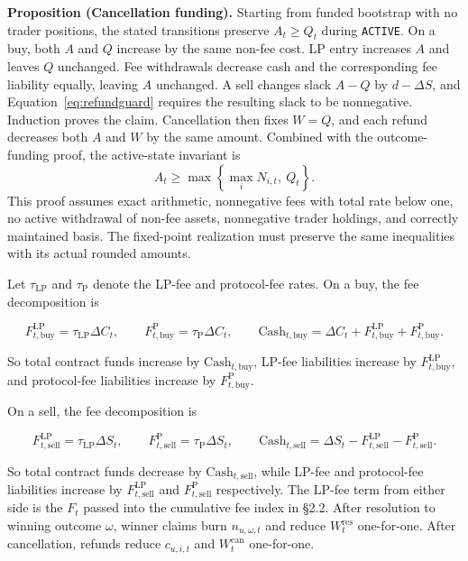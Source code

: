 \documentclass[10pt]{article}
\begin{document}
\textbf{Proposition (Cancellation funding).}
Starting from funded bootstrap with no trader positions, the stated transitions preserve $A_t\ge Q_t$ during \texttt{ACTIVE}. On a buy, both $A$ and $Q$ increase by the same non-fee cost. LP entry increases $A$ and leaves $Q$ unchanged. Fee withdrawals decrease cash and the corresponding fee liability equally, leaving $A$ unchanged. A sell changes slack $A-Q$ by $d-\Delta S$, and Equation~\ref{eq:refundguard} requires the resulting slack to be nonnegative. Induction proves the claim. Cancellation then fixes $W=Q$, and each refund decreases both $A$ and $W$ by the same amount. Combined with the outcome-funding proof, the active-state invariant is
\[
A_t\ge\max\!\left\{\max_i N_{i,t},\ Q_t\right\}.
\]
This proof assumes exact arithmetic, nonnegative fees with total rate below one, no active withdrawal of non-fee assets, nonnegative trader holdings, and correctly maintained basis. The fixed-point realization must preserve the same inequalities with its actual rounded amounts.

Let $\tau_{\mathrm{LP}}$ and $\tau_{\mathrm{P}}$ denote the LP-fee and protocol-fee rates. On a buy, the fee decomposition is

\[
F_{t,\mathrm{buy}}^{\mathrm{LP}} = \tau_{\mathrm{LP}} \Delta C_t,
\qquad
F_{t,\mathrm{buy}}^{\mathrm{P}} = \tau_{\mathrm{P}} \Delta C_t,
\qquad
\mathrm{Cash}_{t,\mathrm{buy}} = \Delta C_t + F_{t,\mathrm{buy}}^{\mathrm{LP}} + F_{t,\mathrm{buy}}^{\mathrm{P}}.
\]

So total contract funds increase by $\mathrm{Cash}_{t,\mathrm{buy}}$, LP-fee liabilities increase by $F_{t,\mathrm{buy}}^{\mathrm{LP}}$, and protocol-fee liabilities increase by $F_{t,\mathrm{buy}}^{\mathrm{P}}$.

On a sell, the fee decomposition is

\[
F_{t,\mathrm{sell}}^{\mathrm{LP}} = \tau_{\mathrm{LP}} \Delta S_t,
\qquad
F_{t,\mathrm{sell}}^{\mathrm{P}} = \tau_{\mathrm{P}} \Delta S_t,
\qquad
\mathrm{Cash}_{t,\mathrm{sell}} = \Delta S_t - F_{t,\mathrm{sell}}^{\mathrm{LP}} - F_{t,\mathrm{sell}}^{\mathrm{P}}.
\]

So total contract funds decrease by $\mathrm{Cash}_{t,\mathrm{sell}}$, while LP-fee and protocol-fee liabilities increase by $F_{t,\mathrm{sell}}^{\mathrm{LP}}$ and $F_{t,\mathrm{sell}}^{\mathrm{P}}$ respectively. The LP-fee term from either side is the $F_t$ passed into the cumulative fee index in \S2.2. After resolution to winning outcome $\omega$, winner claims burn $n_{u,\omega,t}$ and reduce $W_t^{\mathrm{res}}$ one-for-one. After cancellation, refunds reduce $c_{u,i,t}$ and $W_t^{\mathrm{can}}$ one-for-one.
\end{document}
